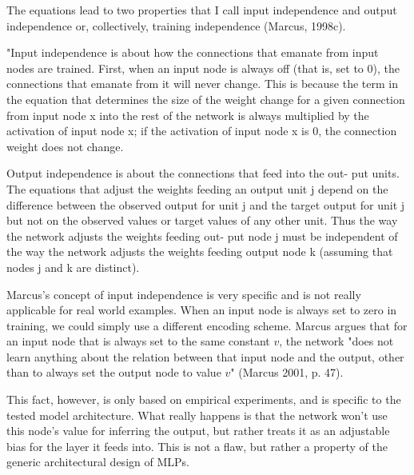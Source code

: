 \documentclass[../../main.tex]{subfiles}
\begin{document}
\begin{citecallout}
    The equations lead to two properties that I call input independence and
    output independence or, collectively, training independence (Marcus, 1998c).
\end{citecallout}

\begin{citecallout}
    \begin{definition}
        "Input independence is about how the connections that emanate from input nodes are trained. First, when an input node is always off (that is, set
        to 0), the connections that emanate from it will never change. This is
        because the term in the equation that determines the size of the weight
        change for a given connection from input node x into the rest of the network is always multiplied by the activation of input node x; if the activation of input node x is 0, the connection weight does not change.
    \end{definition}
\end{citecallout}

\begin{citecallout}
    \begin{definition}
        Output independence is about the connections that feed into the out-
        put units. The equations that adjust the weights feeding an output unit
        j depend on the difference between the observed output for unit j and
        the target output for unit j but not on the observed values or target values of
        any other unit. Thus the way the network adjusts the weights feeding out-
        put node j must be independent of the way the network adjusts the
        weights feeding output node k (assuming that nodes j and k are distinct).
    \end{definition}
\end{citecallout}

\begin{critique}
    Marcus's concept of input independence is very specific and is not really applicable for real world examples. When an input node is always set to zero in training, we could simply use a different encoding scheme. Marcus argues that for an input node that is always set to the same constant $v$, the network "does not learn anything about the relation between that
    input node and the output, other than to always set the output node to value $v$" (Marcus 2001, p. 47).

    This fact, however, is only based on empirical experiments, and is specific to the tested model architecture. What really happens is that the network won't use this node's value for inferring the output, but rather treats it as an adjustable bias for the layer it feeds into. This is not a flaw, but rather a property of the generic architectural design of MLPs.
\end{critique}
\end{document}
